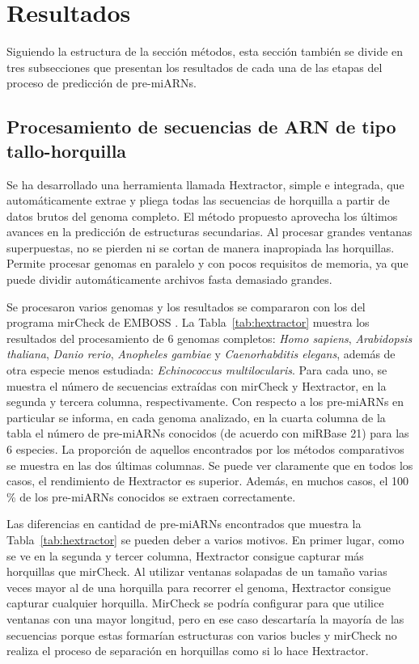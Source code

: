 \chapter{Resultados} \label{sec:results}

Siguiendo la estructura de la sección métodos, esta sección también se divide en tres subsecciones que presentan los resultados de cada una de las etapas
del proceso de predicción de pre-miARNs.

\section{Procesamiento de secuencias de ARN de tipo tallo-horquilla}

Se ha desarrollado una herramienta llamada Hextractor, simple e integrada, que automáticamente extrae y pliega todas las secuencias de horquilla a partir de
datos brutos del genoma completo. El método propuesto aprovecha los últimos avances en la predicción de estructuras secundarias. Al procesar grandes
ventanas superpuestas, no se pierden ni se cortan de manera inapropiada las horquillas. Permite procesar genomas en paralelo y con pocos requisitos de memoria,
ya que puede dividir automáticamente archivos fasta demasiado grandes.

Se procesaron varios genomas y los resultados se compararon con los del programa mirCheck de EMBOSS \citep{olson2002emboss}. La Tabla~\ref{tab:hextractor} muestra los
resultados del procesamiento de 6 genomas completos: \textit{Homo sapiens}, \textit{Arabidopsis thaliana}, \textit{Danio rerio}, \textit{Anopheles gambiae} y
\textit{Caenorhabditis elegans}, además de otra especie menos estudiada: \textit{Echinococcus multilocularis}. Para cada uno, se muestra el número de
secuencias extraídas con mirCheck y Hextractor, en la segunda y tercera columna, respectivamente. Con respecto a los pre-miARNs en particular se informa, en
cada genoma analizado, en la cuarta columna de la tabla el número de pre-miARNs conocidos (de acuerdo con miRBase 21) para las 6 especies. La proporción de
aquellos encontrados por los métodos comparativos se muestra en las dos últimas columnas. Se puede ver claramente que en todos los casos, el rendimiento de
Hextractor es superior. Además, en muchos casos, el 100 \% de los pre-miARNs conocidos se extraen correctamente.

Las diferencias en cantidad de pre-miARNs encontrados que muestra la Tabla~\ref{tab:hextractor} se pueden deber a varios motivos. En primer lugar, como se ve en
la segunda y tercer columna, Hextractor consigue capturar más horquillas que mirCheck. Al utilizar ventanas solapadas de un tamaño varias veces mayor al de
una horquilla para recorrer el genoma, Hextractor consigue capturar cualquier horquilla. MirCheck se podría configurar para que utilice ventanas con una mayor
longitud, pero en ese caso descartaría la mayoría de las secuencias porque estas formarían estructuras con varios bucles y mirCheck no realiza el proceso de
separación en horquillas como si lo hace Hextractor.

